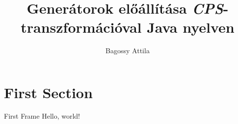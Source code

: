 \documentclass{beamer}
\title{Generátorok előállítása \textit{CPS}-transzformációval Java nyelven}
\date{\presentationdate}
\author{Bagossy Attila}
\institute{Centre for Modern Beamer Themes}
\begin{document}
  \maketitle
  \section{First Section}
  \begin{frame}{First Frame}
    Hello, world!
  \end{frame}
\end{document}
